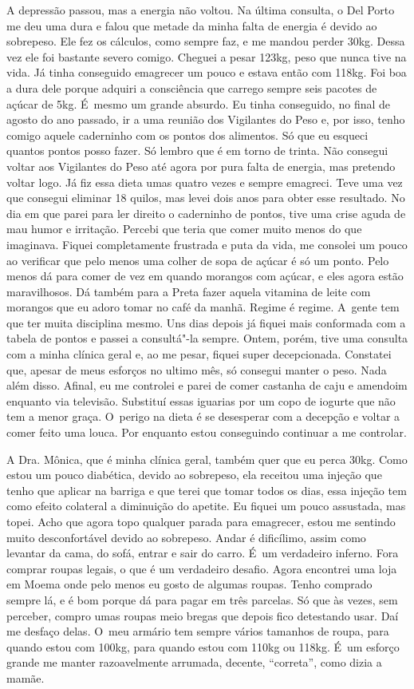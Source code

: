 A depressão passou, mas a energia não voltou. Na última consulta, o Del
Porto me deu uma dura e falou que metade da minha falta de energia é
devido ao sobrepeso. Ele fez os cálculos, como sempre faz, e me mandou
perder 30kg. Dessa vez ele foi bastante severo comigo. Cheguei a pesar
123kg, peso que nunca tive na vida. Já tinha conseguido emagrecer um
pouco e estava então com 118kg. Foi boa a dura dele porque adquiri a
consciência que carrego sempre seis pacotes de açúcar de 5kg. É~mesmo um
grande absurdo. Eu tinha conseguido, no final de agosto do ano passado,
ir a uma reunião dos Vigilantes do Peso e, por isso, tenho comigo aquele
caderninho com os pontos dos alimentos. Só que eu esqueci quantos pontos
posso fazer. Só lembro que é em torno de trinta. Não consegui voltar aos
Vigilantes do Peso até agora por pura falta de energia, mas pretendo
voltar logo. Já fiz essa dieta umas quatro vezes e sempre emagreci. Teve
uma vez que consegui eliminar 18 quilos, mas levei dois anos para obter
esse resultado. No dia em que parei para ler direito o caderninho de
pontos, tive uma crise aguda de mau humor e irritação. Percebi que teria
que comer muito menos do que imaginava. Fiquei completamente frustrada e
puta da vida, me consolei um pouco ao verificar que pelo menos uma
colher de sopa de açúcar é só um ponto. Pelo menos dá para comer de vez
em quando morangos com açúcar, e eles agora estão maravilhosos. Dá
também para a Preta fazer aquela vitamina de leite com morangos que eu
adoro tomar no café da manhã. Regime é regime. A~gente tem que ter muita
disciplina mesmo. Uns dias depois já fiquei mais conformada com a tabela
de pontos e passei a consultá"-la sempre. Ontem, porém, tive uma consulta
com a minha clínica geral e, ao me pesar, fiquei super decepcionada.
Constatei que, apesar de meus esforços no ultimo mês, só consegui manter
o peso. Nada além disso. Afinal, eu me controlei e parei de comer
castanha de caju e amendoim enquanto via televisão. Substituí essas
iguarias por um copo de iogurte que não tem a menor graça. O~perigo na
dieta é se desesperar com a decepção e voltar a comer feito uma louca.
Por enquanto estou conseguindo continuar a me controlar.

A Dra. Mônica, que é minha clínica geral, também quer que eu perca 30kg.
Como estou um pouco diabética, devido ao sobrepeso, ela receitou uma
injeção que tenho que aplicar na barriga e que terei que tomar todos os
dias, essa injeção tem como efeito colateral a diminuição do apetite. Eu
fiquei um pouco assustada, mas topei. Acho que agora topo qualquer
parada para emagrecer, estou me sentindo muito desconfortável devido ao
sobrepeso. Andar é dificílimo, assim como levantar da cama, do sofá,
entrar e sair do carro. É~um verdadeiro inferno. Fora comprar roupas
legais, o que é um verdadeiro desafio. Agora encontrei uma loja em Moema
onde pelo menos eu gosto de algumas roupas. Tenho comprado sempre lá, e
é bom porque dá para pagar em três parcelas. Só que às vezes, sem
perceber, compro umas roupas meio bregas que depois fico detestando
usar. Daí me desfaço delas. O~meu armário tem sempre vários tamanhos de
roupa, para quando estou com 100kg, para quando estou com 110kg ou
118kg. É~um esforço grande me manter razoavelmente arrumada, decente,
``correta'', como dizia a mamãe.


